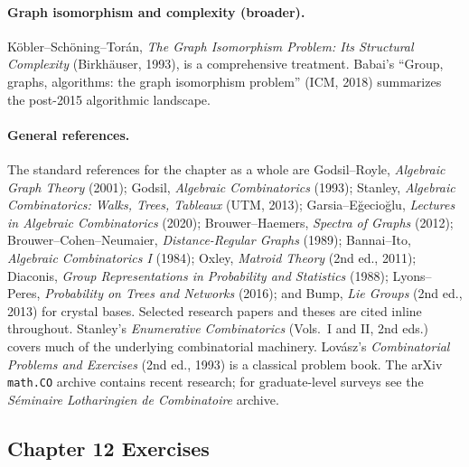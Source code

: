 \paragraph{Graph isomorphism and complexity (broader).}
K\"obler--Sch\"oning--Tor\'an, \emph{The Graph Isomorphism Problem:
Its Structural Complexity} (Birkh\"auser, 1993), is a comprehensive
treatment. Babai's ``Group, graphs, algorithms: the graph isomorphism
problem'' (ICM, 2018) summarizes the post-2015 algorithmic landscape.

\paragraph{General references.} The standard references for the chapter
as a whole are Godsil--Royle, \emph{Algebraic Graph Theory} (2001);
Godsil, \emph{Algebraic Combinatorics} (1993);
Stanley, \emph{Algebraic Combinatorics: Walks, Trees, Tableaux} (UTM,
2013); Garsia--E\u{g}ecio\u{g}lu, \emph{Lectures in Algebraic Combinatorics}
(2020); Brouwer--Haemers, \emph{Spectra of Graphs} (2012);
Brouwer--Cohen--Neumaier, \emph{Distance-Regular Graphs} (1989);
Bannai--Ito, \emph{Algebraic Combinatorics I} (1984); Oxley,
\emph{Matroid Theory} (2nd ed., 2011); Diaconis,
\emph{Group Representations in Probability and Statistics} (1988);
Lyons--Peres, \emph{Probability on Trees and Networks} (2016);
and Bump, \emph{Lie Groups} (2nd ed., 2013) for crystal bases. Selected research papers and theses are cited inline throughout. Stanley's
\emph{Enumerative Combinatorics} (Vols.\ I and II, 2nd eds.) covers
much of the underlying combinatorial machinery. Lov\'asz's
\emph{Combinatorial Problems and Exercises} (2nd ed., 1993) is a
classical problem book. The arXiv \texttt{math.CO} archive contains
recent research; for graduate-level surveys see the
\emph{S\'eminaire Lotharingien de Combinatoire} archive.

\subsection{Chapter 12 Exercises}

